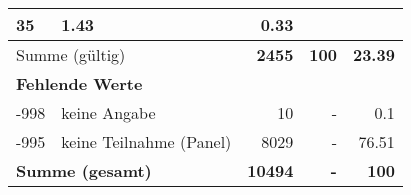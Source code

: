 \begin{longtable}{lXrrr}
       \num{35} &
       \num[round-mode=places,round-precision=2]{1,43} &
         \num[round-mode=places,round-precision=2]{0,33} \\
     \midrule
     \multicolumn{2}{l}{Summe (gültig)} &
       \textbf{\num{2455}} &
     \textbf{100} &
       \textbf{\num[round-mode=places,round-precision=2]{23,39}} \\
     \multicolumn{5}{l}{\textbf{Fehlende Werte}}\\
       -998 &
       keine Angabe &
         \num{10} &
        - &
         \num[round-mode=places,round-precision=2]{0,1} \\
       -995 &
       keine Teilnahme (Panel) &
         \num{8029} &
        - &
         \num[round-mode=places,round-precision=2]{76,51} \\
     \midrule
     \multicolumn{2}{l}{\textbf{Summe (gesamt)}} &
          \textbf{\num{10494}} &
        \textbf{-} &
        \textbf{100} \\
     \bottomrule
     \end{longtable}
     
